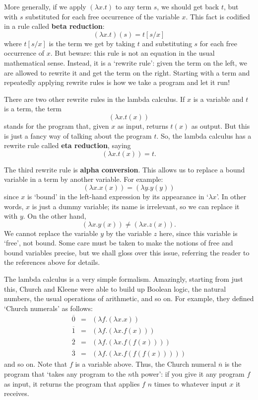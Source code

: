 \documentclass[12pt]{article}
\begin{document}
More generally, if we apply $(\lambda x . t)$ to any term $s$, 
we should get back $t$, but with $s$ substituted for each free
occurrence of the variable $x$.  This fact is codified in a rule 
called {\bf beta reduction}:
\[       (\lambda x.t)(s) = t[s/x] \]
where $t[s/x]$ is the term we get by taking $t$ and substituting $s$
for each free occurrence of $x$.  But beware: this rule is not an
equation in the usual mathematical sense.  Instead, it is a `rewrite
rule': given the term on the left, we are allowed to rewrite it and
get the term on the right.  Starting with a term and repeatedly 
applying rewrite rules is how we take a program and let it run!

There are two other rewrite rules in the lambda calculus.  If $x$ is a
variable and $t$ is a term, the term
\[    (\lambda x . t(x)) \]
stands for the program that, given $x$ as input, returns $t(x)$ as
output.  But this is just a fancy way of talking about the program
$t$.  So, the lambda calculus has a rewrite rule called {\bf eta
reduction}, saying
\[        (\lambda x . t(x)) = t. \]

The third rewrite rule is {\bf alpha conversion}.  This allows
us to replace a bound variable in a term by another variable.  
For example:
\[        (\lambda x . x(x)) = (\lambda y . y(y))  \]
since $x$ is `bound' in the left-hand expression by its appearance
in `$\lambda x$'.   In other words, $x$ is just a dummy variable;
its name is irrelevant, so we can replace it with $y$.  On the other 
hand,
\[        (\lambda x . y(x)) \ne (\lambda x . z(x)).  \]
We cannot replace the variable $y$ by the variable $z$ here, since 
this variable is `free', not bound.  Some care must be taken to make
the notions of free and bound variables precise, but we shall gloss over 
this issue, referring the reader to the references above for details.

The lambda calculus is a very simple formalism.  Amazingly, starting
from just this, Church and Kleene were able to build up Boolean logic,
the natural numbers, the usual operations of arithmetic, and so on.
For example, they defined `Church numerals' as follows:
\[  \begin{array}{ccl}
       \overline{0} &=& (\lambda f . (\lambda x . x))          \\
       \overline{1} &=& (\lambda f . (\lambda x . f(x)))   \\
       \overline{2} &=& (\lambda f . (\lambda x . f(f(x))))   \\
       \overline{3} &=& (\lambda f . (\lambda x . f(f(f(x)))))
\end{array}   \]
and so on.  Note that $f$ is a variable above.  Thus, the Church
numeral $\overline{n}$ is the program that `takes any program to the
$n$th power': if you give it any program $f$ as input, it returns the
program that applies $f$ $n$ times to whatever input $x$ it receives.
\end{document}
